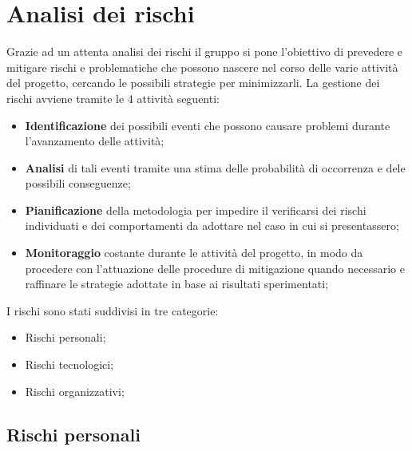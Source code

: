 \section{Analisi dei rischi}

Grazie ad un attenta analisi dei rischi il gruppo si pone l'obiettivo di prevedere e mitigare rischi e problematiche che possono nascere nel corso delle varie attività del progetto, cercando le possibili strategie per minimizzarli. 
La gestione dei rischi avviene tramite le 4 attività seguenti:
\begin{itemize}
	\item \textbf{Identificazione} dei possibili eventi che possono causare problemi durante l'avanzamento delle attività;
	\item \textbf{Analisi} di tali eventi tramite una stima delle probabilità di occorrenza e dele possibili conseguenze;
	\item \textbf{Pianificazione} della metodologia per impedire il verificarsi dei rischi individuati e dei comportamenti da adottare nel caso in cui si presentassero;
	\item \textbf{Monitoraggio} costante durante le attività del progetto, in modo da procedere con l'attuazione delle procedure di mitigazione quando necessario e raffinare le strategie adottate in base ai risultati sperimentati;
	
\end{itemize}

I rischi sono stati suddivisi in tre categorie:
\begin{itemize}
	\item Rischi personali;
	\item Rischi tecnologici;
	\item Rischi organizzativi;
\end{itemize}

\subsection{Rischi personali}

